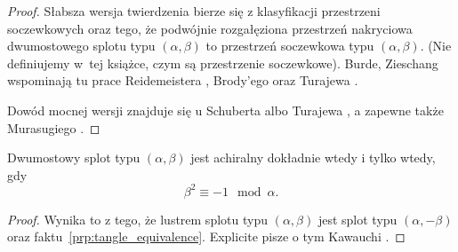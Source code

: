 \begin{proof}
    Słabsza wersja twierdzenia bierze się z klasyfikacji przestrzeni soczewkowych oraz tego, że podwójnie rozgałęziona przestrzeń nakryciowa dwumostowego splotu typu $(\alpha, \beta)$ to przestrzeń soczewkowa typu $(\alpha, \beta)$.
    (Nie definiujemy w~tej książce, czym są przestrzenie soczewkowe).
%
    Burde, Zieschang \cite[s. 212]{burde2014} wspominają tu prace Reidemeistera \cite{reidemeister1935}, Brody'ego \cite{brody1960} oraz Turajewa \cite{turaevXX}.

    Dowód mocnej wersji znajduje się u Schuberta \cite{schubert1956} albo Turajewa \cite{turaevXX}, a zapewne także Murasugiego \cite[s. 158]{murasugi1996}.
\end{proof}

\begin{proposition}
    Dwumostowy splot typu $(\alpha, \beta)$ jest achiralny dokładnie wtedy i tylko wtedy, gdy
    \begin{equation}
        \beta^2 \equiv -1 \mod \alpha.
    \end{equation}
\end{proposition}

\begin{proof}
    Wynika to z tego, że lustrem splotu typu $(\alpha, \beta)$ jest splot typu $(\alpha, -\beta)$ oraz faktu~\ref{prp:tangle_equivalence}.
    Explicite pisze o tym Kawauchi \cite[s. 24]{kawauchi1996}.
\end{proof}


